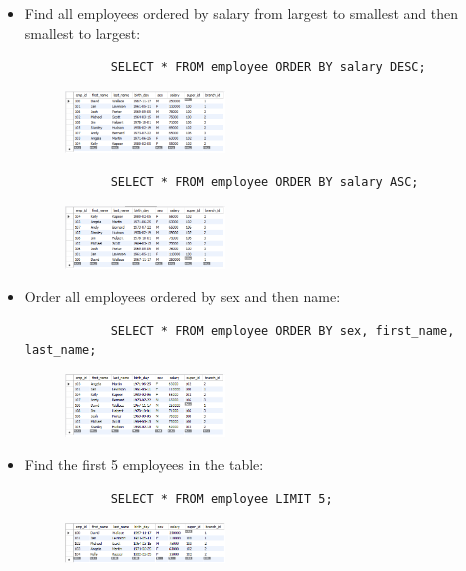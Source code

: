 \begin{itemize}
    \item Find all employees ordered by salary from largest to smallest and then smallest to largest:
        \begin{verbatim}
            SELECT * FROM employee ORDER BY salary DESC;
        \end{verbatim}
        \begin{figure}[H]
            \centering
            \includegraphics[width=0.4\textwidth]{./Figs/2020-12-24-20-44-00.png}
        \end{figure}
        \begin{verbatim}
            SELECT * FROM employee ORDER BY salary ASC;
        \end{verbatim}
        \begin{figure}[H]
            \centering
            \includegraphics[width=0.4\textwidth]{./Figs/2020-12-24-20-44-41.png}
        \end{figure}
    
    \item Order all employees ordered by sex and then name:
        \begin{verbatim}
            SELECT * FROM employee ORDER BY sex, first_name, last_name; 
        \end{verbatim}
        \begin{figure}[H]
            \centering
            \includegraphics[width=0.4\textwidth]{./Figs/2020-12-24-20-43-11.png}
        \end{figure}
    
    \item Find the first 5 employees in the table:
        \begin{verbatim}
            SELECT * FROM employee LIMIT 5;
        \end{verbatim}
        \begin{figure}[H]
            \centering
            \includegraphics[width=0.4\textwidth]{./Figs/2020-12-24-20-45-25.png}
        \end{figure}
    

\end{itemize}

